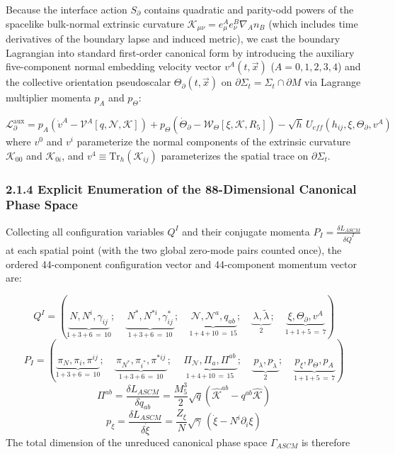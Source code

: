 \documentclass[aps,prd,onecolumn,superscriptaddress,nofootinbib,longbibliography,10pt]{revtex4-2}
\begin{document}
  Because the interface action \(S_\partial\) contains quadratic and parity-odd powers of the spacelike bulk-normal extrinsic curvature \(\mathcal{K}_{\mu\nu} = e^A_\mu e^B_\nu \nabla_A n_B\) (which includes time derivatives of the boundary lapse and induced metric), we cast the boundary Lagrangian into standard first-order canonical form by introducing the auxiliary five-component normal embedding velocity vector \(v^A(t,\vec{x})\) (\(A = 0,1,2,3,4\)) and the collective orientation pseudoscalar \(\Theta_\partial(t,\vec{x})\) on \(\partial\Sigma_t = \Sigma_t \cap \partial M\) via Lagrange multiplier momenta \(p_A\) and \(p_\Theta\):


  \[ \mathcal{L}_\partial^{\text{aux}} = p_A\left(\dot{v}^A - \mathcal{V}^A[q,\mathcal{N},\mathcal{K}]\right) + p_\Theta\left(\dot{\Theta}_\partial - \mathcal{W}_\Theta[\xi,\mathcal{K},R_5]\right) - \sqrt{h}\,U_{eff}(h_{ij},\xi,\Theta_\partial,v^A) \]
  where \(v^0\) and \(v^i\) parameterize the normal components of the extrinsic curvature \(\mathcal{K}_{00}\) and \(\mathcal{K}_{0i}\), and \(v^4 \equiv \text{Tr}_h(\mathcal{K}_{ij})\) parameterizes the spatial trace on \(\partial\Sigma_t\).



  
\subsubsection*{2.1.4 Explicit Enumeration of the 88-Dimensional Canonical Phase Space}

  Collecting all configuration variables \(Q^I\) and their conjugate momenta \(P_I = \frac{\delta L_{ASCM}}{\delta\dot{Q}^I}\) at each spatial point (with the two global zero-mode pairs counted once), the ordered 44-component configuration vector and 44-component momentum vector are:


  \[ Q^I = \left( \underbrace{\,N, N^i, \gamma_{ij}\,}_{{1\,\mathbf{+}\,3\,\mathbf{+}\,6\,\mathbf{=}\,10}};\quad \underbrace{\,N^*, N^{*i}, \gamma_{ij}^*\,}_{{1\,\mathbf{+}\,3\,\mathbf{+}\,6\,\mathbf{=}\,10}};\quad \underbrace{\,\mathcal{N}, \mathcal{N}^a, q_{ab}\,}_{{1\,\mathbf{+}\,4\,\mathbf{+}\,10\,\mathbf{=}\,15}};\quad \underbrace{\,\lambda, \tilde{\lambda}\,}_{{2}};\quad \underbrace{\,\xi, \Theta_{\partial}, v^A\,}_{{1\,\mathbf{+}\,1\,\mathbf{+}\,5\,\mathbf{=}\,7}} \right) \]
  \[ P_I = \left( \underbrace{\,\pi_N, \pi_i, \pi^{ij}\,}_{{1\,\mathbf{+}\,3\,\mathbf{+}\,6\,\mathbf{=}\,10}};\quad \underbrace{\,\pi_{N^*}, \pi_{i^*}, \pi^{*ij}\,}_{{1\,\mathbf{+}\,3\,\mathbf{+}\,6\,\mathbf{=}\,10}};\quad \underbrace{\,\Pi_{\mathcal{N}}, \Pi_a, \Pi^{ab}\,}_{{1\,\mathbf{+}\,4\,\mathbf{+}\,10\,\mathbf{=}\,15}};\quad \underbrace{\,p_{\lambda}, p_{\tilde{\lambda}}\,}_{{2}};\quad \underbrace{\,p_{\xi}, p_{\Theta}, p_A\,}_{{1\,\mathbf{+}\,1\,\mathbf{+}\,5\,\mathbf{=}\,7}} \right) \]
\[\Pi^{ab} = \frac{\delta L_{ASCM}}{\delta \dot{q}_{ab}} = \frac{M_5^3}{2}\sqrt{q}\left(\widehat{\mathcal{K}}^{ab} - q^{ab}\widehat{\mathcal{K}}\right)\]
\[ p_\xi = \frac{\delta L_{ASCM}}{\delta\dot{\xi}} = \frac{Z_\xi}{N}\sqrt{\gamma}\,(\dot{\xi} - N^i\partial_i\xi) \]
  The total dimension of the unreduced canonical phase space \(\Gamma_{ASCM}\) is therefore
\end{document}
